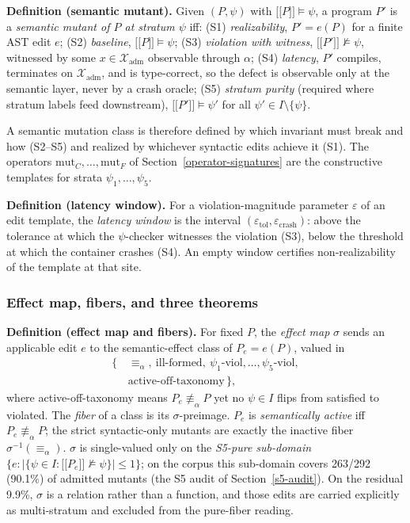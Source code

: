 \documentclass[manuscript,screen,review]{acmart}
\begin{document}
\textbf{Definition (semantic mutant).} Given $(P, \psi)$ with
$\mathopen{\lbrack\!\lbrack} P \mathclose{\rbrack\!\rbrack} \models \psi$, a program $P'$ is a
\emph{semantic mutant of $P$ at stratum $\psi$} iff: (S1)
\emph{realizability}, $P' = e(P)$ for a finite AST edit $e$; (S2)
\emph{baseline}, $\mathopen{\lbrack\!\lbrack} P \mathclose{\rbrack\!\rbrack} \models \psi$; (S3)
\emph{violation with witness},
$\mathopen{\lbrack\!\lbrack} P' \mathclose{\rbrack\!\rbrack} \not\models \psi$, witnessed by some
$x \in \mathcal{X}_{\mathrm{adm}}$ observable through $\alpha$; (S4)
\emph{latency}, $P'$ compiles, terminates on $\mathcal{X}_{\mathrm{adm}}$,
and is type-correct, so the defect is observable only at the semantic
layer, never by a crash oracle; (S5) \emph{stratum purity} (required
where stratum labels feed downstream),
$\mathopen{\lbrack\!\lbrack} P' \mathclose{\rbrack\!\rbrack} \models \psi'$ for all
$\psi' \in I \setminus \{\psi\}$.

A semantic mutation class is therefore defined by which invariant must
break and how (S2--S5) and realized by whichever syntactic edits achieve
it (S1). The operators $\mathrm{mut}_C, \dots, \mathrm{mut}_F$ of Section~\ref{operator-signatures}
are the constructive templates for strata $\psi_1, \dots, \psi_5$.

\textbf{Definition (latency window).} For a violation-magnitude
parameter $\varepsilon$ of an edit template, the \emph{latency window}
is the interval $(\varepsilon_{\mathrm{tol}}, \varepsilon_{\mathrm{crash}})$:
above the tolerance at which the $\psi$-checker witnesses the violation
(S3), below the threshold at which the container crashes (S4). An empty
window certifies non-realizability of the template at that site.

\subsubsection{Effect map, fibers, and three theorems}\label{theory-fibers}

\textbf{Definition (effect map and fibers).} For fixed $P$, the
\emph{effect map} $\sigma$ sends an applicable edit $e$ to the
semantic-effect class of $P_e = e(P)$, valued in
\[
\begin{aligned}
\{\,&\equiv_\alpha,\ \text{ill-formed},\
      \psi_1\text{-viol}, \dots, \psi_5\text{-viol},\\
   &\text{active-off-taxonomy}\,\},
\end{aligned}
\]
where active-off-taxonomy means $P_e \not\equiv_\alpha P$ yet no
$\psi \in I$ flips from satisfied to violated. The \emph{fiber} of a
class is its $\sigma$-preimage. $P_e$ is \emph{semantically active} iff
$P_e \not\equiv_\alpha P$; the strict syntactic-only mutants are exactly
the inactive fiber $\sigma^{-1}(\equiv_\alpha)$. $\sigma$ is single-valued
only on the \emph{S5-pure sub-domain}
$\{e : |\{\psi \in I : \mathopen{\lbrack\!\lbrack} P_e \mathclose{\rbrack\!\rbrack} \not\models \psi\}| \le 1\}$;
on the corpus this sub-domain covers 263/292 (90.1\%) of admitted mutants
(the S5 audit of Section~\ref{s5-audit}). On the residual 9.9\%, $\sigma$
is a relation rather than a function, and those edits are carried
explicitly as multi-stratum and excluded from the pure-fiber reading.
\end{document}
